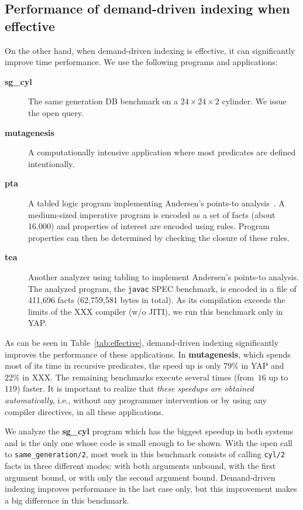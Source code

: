 \documentclass{llncs}
\newcommand{\JITI}{demand-driven indexing\xspace}
\newcommand{\bench}[1]{\textbf{\textsf{#1}}}
\newcommand{\sgCyl}{\bench{sg\_cyl}\xspace}
\newcommand{\muta}{\bench{mutagenesis}\xspace}
\newcommand{\pta}{\bench{pta}\xspace}
\newcommand{\tea}{\bench{tea}\xspace}
\newcommand{\TODOcomment}[2]{%
  \stepcounter{TODOcounter#1}%
  {\scriptsize\bf$^{(\arabic{TODOcounter#1})}$}%
  \marginpar[\fbox{
    \parbox{2cm}{\raggedleft
      \scriptsize$^{({\bf{\arabic{TODOcounter#1}{#1}}})}$%
      \scriptsize #2}}]%
  {\fbox{\parbox{2cm}{\raggedright
      \scriptsize$^{({\bf{\arabic{TODOcounter#1}{#1}}})}$%
      \scriptsize #2}}}
}%
\newcounter{TODOcounter}
\newcommand{\TODO}[1]{\TODOcomment{}{#1}}
\begin{document}
\subsection{Performance of \JITI when effective} \label{sec:perf:effective}
On the other hand, when \JITI is effective, it can significantly
improve time performance. We use the following programs and
applications:
\begin{description}
\item[\sgCyl] The same generation DB benchmark on a $24 \times 24
  \times 2$ cylinder. We issue the open query.
\item[\muta] A computationally intensive application where most
  predicates are defined intentionally.
\item[\pta] A tabled logic program implementing Andersen's points-to
  analysis~\cite{anderson-phd}. A medium-sized imperative program is
  encoded as a set of facts (about 16,000) and properties of interest
  are encoded using rules. Program properties can then be determined
  by checking the closure of these rules.
\item[\tea] Another analyzer using tabling to implement Andersen's
  points-to analysis. The analyzed program, the \texttt{javac} SPEC
  benchmark, is encoded in a file of 411,696 facts (62,759,581 bytes
  in total). As its compilation exceeds the limits of the XXX compiler
  (w/o JITI), we run this benchmark only in YAP.
\end{description}

As can be seen in Table~\ref{tab:effective}, \JITI significantly
improves the performance of these applications. In \muta, which spends
most of its time in recursive predicates, the speed up is only $79\%$
in YAP and~$22\%$ in XXX. The remaining benchmarks execute several
times (from~$16$ up to~$119$) faster. It is important to realize that
\emph{these speedups are obtained automatically}, i.e., without any
programmer intervention or by using any compiler directives, in all
these applications.

We analyze the \sgCyl program which has the biggest speedup in both
systems and is the only one whose code is small enough to be shown.
With the open call to \texttt{same\_generation/2}, most work in this
benchmark consists of calling \texttt{cyl/2} facts in three different
modes: with both arguments unbound, with the first argument bound, or
with only the second argument bound. Demand-driven indexing improves
performance in the last case only, but this improvement makes a big
difference in this benchmark.
\end{document}
